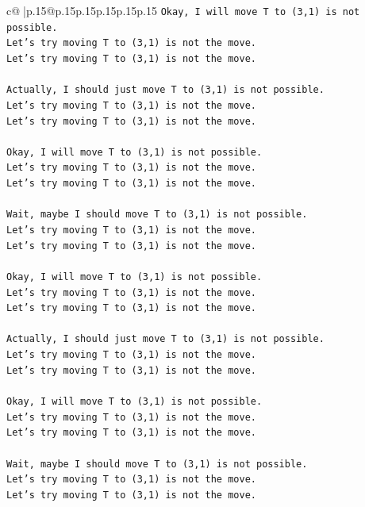 \documentclass{article}
\begin{document}
{\begin{supertabular}{c@{$\;$}|p{.15\linewidth}@{}p{.15\linewidth}p{.15\linewidth}p{.15\linewidth}p{.15\linewidth}p{.15\linewidth}}
{{{\texttt{Okay, I will move T to (3,1) is not possible.} \\
\texttt{Let's try moving T to (3,1) is not the move.} \\
\texttt{Let's try moving T to (3,1) is not the move.} \\
\\ 
\texttt{Actually, I should just move T to (3,1) is not possible.} \\
\texttt{Let's try moving T to (3,1) is not the move.} \\
\texttt{Let's try moving T to (3,1) is not the move.} \\
\\ 
\texttt{Okay, I will move T to (3,1) is not possible.} \\
\texttt{Let's try moving T to (3,1) is not the move.} \\
\texttt{Let's try moving T to (3,1) is not the move.} \\
\\ 
\texttt{Wait, maybe I should move T to (3,1) is not possible.} \\
\texttt{Let's try moving T to (3,1) is not the move.} \\
\texttt{Let's try moving T to (3,1) is not the move.} \\
\\ 
\texttt{Okay, I will move T to (3,1) is not possible.} \\
\texttt{Let's try moving T to (3,1) is not the move.} \\
\texttt{Let's try moving T to (3,1) is not the move.} \\
\\ 
\texttt{Actually, I should just move T to (3,1) is not possible.} \\
\texttt{Let's try moving T to (3,1) is not the move.} \\
\texttt{Let's try moving T to (3,1) is not the move.} \\
\\ 
\texttt{Okay, I will move T to (3,1) is not possible.} \\
\texttt{Let's try moving T to (3,1) is not the move.} \\
\texttt{Let's try moving T to (3,1) is not the move.} \\
\\ 
\texttt{Wait, maybe I should move T to (3,1) is not possible.} \\
\texttt{Let's try moving T to (3,1) is not the move.} \\
\texttt{Let's try moving T to (3,1) is not the move.} \\
}}}
\end{supertabular}}
\end{document}
